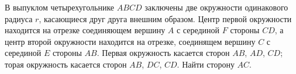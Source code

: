 \documentclass[preview]{standalone}
\begin{document}
В выпуклом четырехугольнике $ABCD$ заключены две окружности одинакового радиуса $r$, 
                          касающиеся друг друга внешним образом. Центр первой окружности находится на отрезке 
                          соединяющем вершину $A$ с серединой $F$ стороны $CD$, а центр второй окружности находится 
                          на отрезке, соединящем вершину $C$ с серединой $E$ стороны $AB$. Первая окружность касается 
                          сторон $AB$, $AD$, $CD$; торая окружность касается сторон $AB$, $DC$, $CD$. Найти сторону $AC$.
\end{document}
